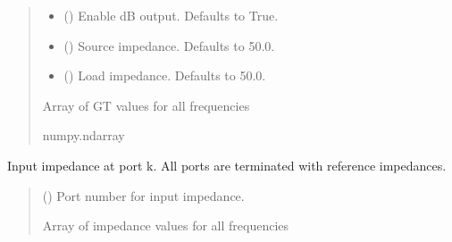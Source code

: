 \documentclass[letterpaper,10pt,english]{sphinxmanual}
\begin{document}
\begin{fulllineitems}
\begin{fulllineitems}
\begin{quote}
\begin{description}
\begin{itemize}
\item {} 
\sphinxAtStartPar
{} (\sphinxstyleliteralemphasis{\sphinxupquote{, }}) \textendash{} Enable dB output. Defaults to True.

\item {} 
\sphinxAtStartPar
{} (\sphinxstyleliteralemphasis{\sphinxupquote{, }}) \textendash{} Source impedance. Defaults to 50.0.

\item {} 
\sphinxAtStartPar
{} (\sphinxstyleliteralemphasis{\sphinxupquote{, }}) \textendash{} Load impedance. Defaults to 50.0.

\end{itemize}

\sphinxAtStartPar
Array of GT values for all frequencies

\sphinxAtStartPar
numpy.ndarray

\end{description}\end{quote}

\end{fulllineitems}


\begin{fulllineitems}
\label{\detokenize{touchstone:touchstone.spfile.input_impedance}}
\pysigstartsignatures
{}
\pysigstopsignatures
\sphinxAtStartPar
Input impedance at port k. All ports are terminated with reference impedances.
\begin{quote}\begin{description}
\sphinxAtStartPar
{} () \textendash{} Port number for input impedance.

\sphinxAtStartPar
Array of impedance values for all frequencies


\end{description}
\end{quote}
\end{fulllineitems}
\end{fulllineitems}
\end{document}
